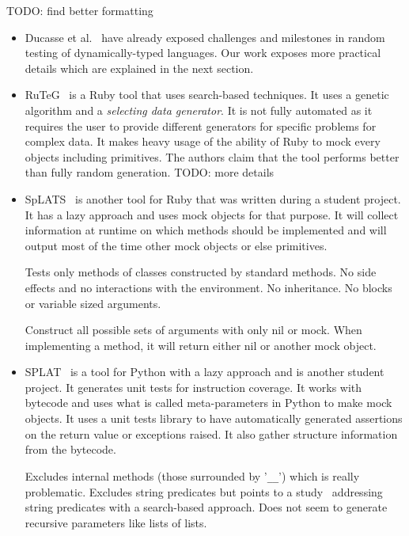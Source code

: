 \documentclass{llncs2e/llncs}
\makeatletter
\def\todo#1{{\color{red}TODO\@: #1}}
\makeatother
\begin{document}
\todo{find better formatting}
\begin{itemize}
  \item Ducasse et al.~\cite{ducasse2011challenges} have already exposed
    challenges and milestones in random testing of dynamically-typed languages.
    Our work exposes more practical details which are explained in the next
    section.

  \item RuTeG~\cite{mairhofer2011search} is a Ruby tool that uses search-based
    techniques. It uses a genetic algorithm and a \textit{selecting data
    generator}. It is not fully automated as it requires the user to provide
    different generators for specific problems for complex data. It makes heavy
    usage of the ability of Ruby to mock every objects including primitives. The
    authors claim that the tool performs better than fully random generation.
    \todo{more details}

  \item SpLATS~\cite{splats} is another tool for Ruby that was written during a
    student project. It has a lazy approach and uses mock objects for that
    purpose. It will collect information at runtime on which methods should be
    implemented and will output most of the time other mock objects or else
    primitives.

    Tests only methods of classes constructed by standard methods. No side
    effects and no interactions with the environment. No inheritance. No blocks
    or variable sized arguments.

    Construct all possible sets of arguments with only nil or mock. When
    implementing a method, it will return either nil or another mock object.

  \item SPLAT~\cite{splat} is a tool for Python with a lazy approach and is
    another student project. It generates unit tests for instruction coverage.
    It works with bytecode and uses what is called meta-parameters in Python to
    make mock objects. It uses a unit tests library to have automatically
    generated assertions on the return value or exceptions raised. It also
    gather structure information from the bytecode.

    Excludes internal methods (those surrounded by '\texttt{\_\_}') which is
    really problematic. Excludes string predicates but points to a
    study~\cite{alshraideh2006search} addressing string predicates with a
    search-based approach. Does not seem to generate recursive parameters like
    lists of lists.
\end{itemize}
\end{document}
